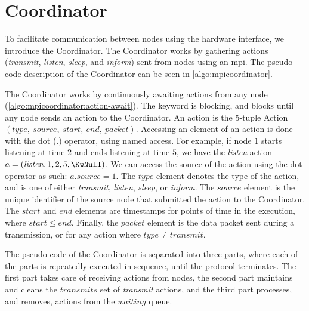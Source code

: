 \clearpage
\section{Coordinator}\label{sec:coordinator}
To facilitate communication between nodes using the hardware interface, we introduce the Coordinator. The
Coordinator works by gathering actions (\textit{transmit}, \textit{listen}, \textit{sleep}, and
\textit{inform}) sent from nodes using an \gls{mpi}. The pseudo code description of the Coordinator can be
seen in \autoref{algo:mpicoordinator}. \smallbreak

The Coordinator works by continuously awaiting actions from any node
(\autoref{algo:mpicoordinator:action-await}). The \KwAwait keyword is blocking, and blocks until any node
sends an action to the Coordinator. An action is the 5-tuple Action = $(\mathit{type},\ \mathit{source},\
\mathit{start},\ \mathit{end},\ \mathit{packet})$. Accessing an element of an action is done with the dot
($.$) operator, using named access. For example, if node $1$ starts listening at time $2$ and ends listening
at time $5$, we have the \textit{listen} action $a = (\mathit{listen}, 1, 2, 5, \KwNull)$. We can access the
source of the action using the dot operator as such: $a.source = 1$. The $\mathit{type}$ element denotes the
type of the action, and is one of either \textit{transmit}, \textit{listen}, \textit{sleep}, or
\textit{inform}. The $\mathit{source}$ element is the unique identifier of the source node that submitted the
action to the Coordinator. The $\mathit{start}$ and $\mathit{end}$ elements are timestamps for points of time
in the execution, where $\mathit{start} \leq \mathit{end}$. Finally, the $\mathit{packet}$ element is the data
packet sent during a transmission, or \KwNull for any action where $\mathit{type} \neq \mathit{transmit}$.
\smallbreak

The pseudo code of the Coordinator is separated into three parts, where each of the parts is repeatedly
executed in sequence, until the protocol terminates. The first part takes care of receiving actions from
nodes, the second part maintains and cleans the $\mathit{transmits}$ set of \textit{transmit} actions, and the
third part processes, and removes, actions from the $\mathit{waiting}$ queue. \smallbreak

